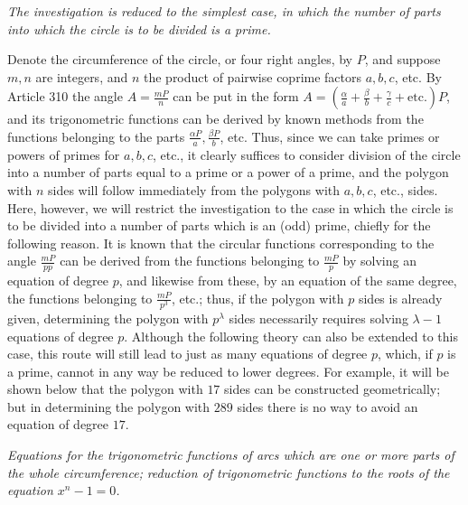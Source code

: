 \begin{center}\textit{The investigation is reduced to the simplest case, in which the number of parts into which the circle is to be divided} \textit{is a prime.}\end{center}


Denote the circumference of the circle, or four right angles, by \(P\), and suppose \(m,\allowbreak n\) are integers, and \(n\) the product of pairwise coprime factors \(a,\allowbreak b,\allowbreak c\), etc. By Article 310 the angle \(A=\frac{mP}{n}\) can be put in the form \(A=(\frac\alpha a+\frac\beta b+\frac\gamma c+\mathrm{etc.})P\), and its trigonometric functions can be derived by known methods from the functions belonging to the parts \(\frac{\alpha P}a,\allowbreak \frac{\beta P}b\), etc. Thus, since we can take primes or powers of primes for \(a,\allowbreak b,\allowbreak c\), etc., it clearly suffices to consider division of the circle into a number of parts equal to a prime or a power of a prime, and the polygon with \(n\) sides will follow immediately from the polygons with \(a,\allowbreak b,\allowbreak c\), etc., sides. Here, however, we will restrict the investigation to the case in which the circle is to be divided into a number of parts which is an (odd) prime, chiefly for the following reason. It is known that the circular functions corresponding to the angle \(\frac{mP}{pp}\) can be derived from the functions belonging to \(\frac{mP}p\) by solving an equation of degree \(p\), and likewise from these, by an equation of the same degree, the functions belonging to \(\frac{mP}{p^3}\), etc.; thus, if the polygon with \(p\) sides is already given, determining the polygon with \(p^\lambda\) sides necessarily requires solving \(\lambda-1\) equations of degree \(p\). Although the following theory can also be extended to this case, this route will still lead to just as many equations of degree \(p\), which, if \(p\) is a prime, cannot in any way be reduced to lower degrees. For example, it will be shown below that the polygon with \(17\) sides can be constructed geometrically; but in determining the polygon with \(289\) sides there is no way to avoid an equation of degree \(17\).

\begin{center}\textit{Equations for the trigonometric functions of arcs which are one or more parts of the whole circumference;} \textit{reduction of trigonometric functions to the roots of the equation \(x^n-1=0\).}\end{center}


